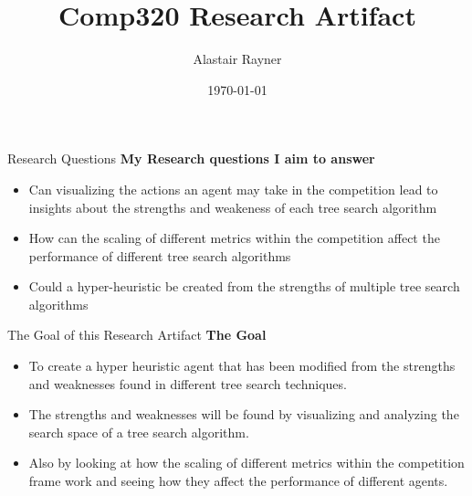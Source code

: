 \documentclass{beamer}
\title{Comp320 Research Artifact}
\author{Alastair Rayner}
\date{\today}
\begin{document}
\maketitle


\begin{frame}{Research Questions}
	\textbf{My Research questions I aim to answer}
	
	
	\begin{itemize}
		\item Can visualizing the actions an agent may take in the competition lead to insights about the strengths and weakeness of each tree search algorithm \pause
		\item How can the scaling of different metrics within the competition affect the performance of different tree search algorithms \pause
		\item Could a hyper-heuristic be created from the strengths of multiple tree search algorithms
	\end{itemize}
\end{frame}



\begin{frame}{The Goal of this Research Artifact}
		\textbf{The Goal} \pause
		\begin{itemize}
			\item To create a hyper heuristic agent that has been modified from the strengths and weaknesses found in different tree search techniques. \pause
			\item The strengths and weaknesses will be found by visualizing and analyzing the search space of a tree search algorithm.   \pause
			\item Also by looking at how the scaling of different metrics within the competition frame work and seeing how they affect the performance of different agents.
		\end{itemize}
\end{frame}
\end{document}

